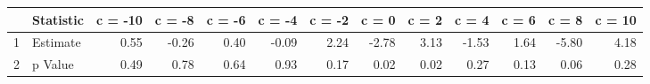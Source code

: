 \begin{tabular}{rlrrrrrrrrrrr}
  \hline
 & Statistic & c = -10 & c = -8 & c = -6 & c = -4 & c = -2 & c = 0 & c = 2 & c = 4 & c = 6 & c = 8 & c = 10 \\ 
  \hline
1 & Estimate & 0.55 & -0.26 & 0.40 & -0.09 & 2.24 & -2.78 & 3.13 & -1.53 & 1.64 & -5.80 & 4.18 \\ 
  2 & p Value & 0.49 & 0.78 & 0.64 & 0.93 & 0.17 & 0.02 & 0.02 & 0.27 & 0.13 & 0.06 & 0.28 \\ 
   \hline
\end{tabular}
